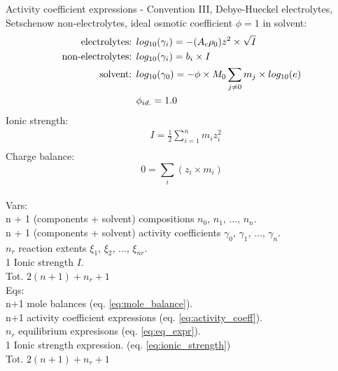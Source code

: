 \documentclass[onecolumn]{article}
\begin{document}
Activity coefficient expressions - Convention III, Debye-Hueckel electrolytes,
Setschenow non-electrolytes, ideal osmotic coefficient $\phi=1$ in solvent:
\begin{equation}
\label{eq:activity_coeff}
\begin{aligned}
\textnormal{electrolytes: } & log_{10}(\gamma_{i}) = -(A_c \rho_0) z^2  \times \sqrt{I} \\
\textnormal{non-electrolytes: } & log_{10}(\gamma_{i}) = b_i \times I \\
\textnormal{solvent: } & log_{10}(\gamma_{0}) =
-\phi \times M_0 \sum_{j\neq0}{m_j} \times log_{10}(e)\\
 & \phi_{id.} =   1.0 \\
\end{aligned}
\end{equation}
Ionic strength:
\begin{equation}
\label{eq:ionic_strength}
\begin{aligned}
& I = \frac{1}{2} \sum_{i=1}^n m_i z_i^2 \\
\end{aligned}
\end{equation}
Charge balance:
\begin{equation}
0 = \sum_i(z_i \times m_i)
\end{equation}
\\
Vars: \\
n + 1 (components + solvent) compositions $n_0$, $n_1$, ..., $n_n$. \\
n + 1 (components + solvent) activity coefficients
$\gamma_0$, $\gamma_1$, ..., $\gamma_n$. \\
$n_r$ reaction extents $\xi_1$, $\xi_2$, ..., $\xi_{nr}$. \\
1 Ionic strength $I$. \\
Tot. $2(n + 1) + n_r + 1$ \\
Eqs: \\
n+1 mole balances (eq. \ref{eq:mole_balance}). \\
n+1 activity coefficient expressions (eq. \ref{eq:activity_coeff}). \\
$n_r$ equilibrium expresisons (eq. \ref{eq:eq_expr}). \\
1 Ionic strength expression. (eq. \ref{eq:ionic_strength})\\
Tot. $2(n + 1) + n_r + 1$
\end{document}
